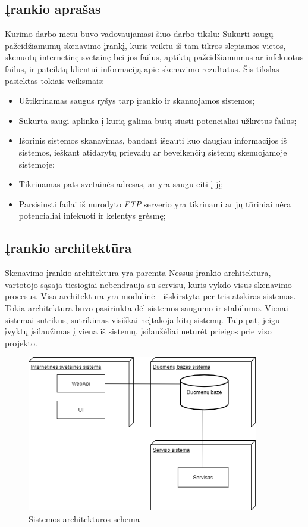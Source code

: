 \documentclass[a4paper,12pt,fleqn]{article}
\begin{document}
\subsection{Įrankio aprašas}
\label{sec:example}

Kurimo darbo metu buvo vadovaujamasi šiuo darbo tikslu: Sukurti saugų pažeidžiamumų skenavimo įrankį, kuris veiktu iš tam tikros slepiamos vietos, skenuotų internetinę
svetainę bei jos failus, aptiktų pažeidžiamumus ar infekuotus failus, ir pateiktų klientui informaciją apie skenavimo rezultatus. Šis tikslas pasiektas tokiais veiksmais:
\begin{itemize}
	\item Užtikrinamas saugus ryšys tarp įrankio ir skanuojamos sistemos;
	\item Sukurta saugi aplinka į kurią galima būtų siusti potencialiai užkrėtus failus;
	\item Išorinis sistemos skanavimas, bandant išgauti kuo daugiau informacijos iš sistemos, ieškant atidarytų prievadų ar beveikenčių sistemų skenuojamoje sistemoje;
	\item Tikrinamas pats svetainės adresas, ar yra saugu eiti į jį;
	\item Parsisiusti failai iš nurodyto \textit{FTP} serverio yra tikrinami ar jų tūriniai nėra potencialiai infekuoti ir kelentys grėsmę;
\end{itemize}



\subsection{Įrankio architektūra}

Skenavimo įrankio architektūra yra paremta Nessus įrankio architektūra, vartotojo sąsaja tiesiogiai nebendrauja su servisu, kuris vykdo visus skenavimo procesus. Visa architektūra yra modulinė - išskirstyta per tris atskiras sistemas. Tokia architektūra buvo pasirinkta dėl sistemos saugumo ir stabilumo. Vienai sistemai sutrikus, sutrikimas visiškai neįtakoja kitų sistemų. Taip pat, jeigu įvyktų įsilaužimas į viena iš sistemų, įsilaužėliai neturėt prieigos prie viso projekto.

\begin{figure}[H]
	\centering
	\includegraphics[width=0.9\textwidth]{figs/arch1lt.png}
	\caption{Sistemos architektūros schema}
	\label{fig:arch1}
\end{figure}
\end{document}

